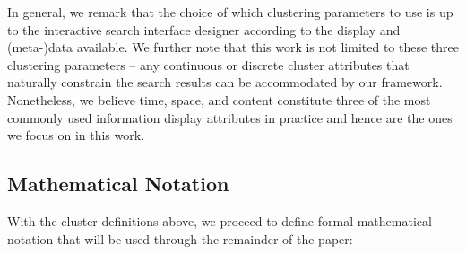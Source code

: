 In general, we remark that the choice of which clustering parameters to use is up to the interactive search interface designer according to the display and (meta-)data available.  We further note that this work is not limited to these three clustering parameters -- any continuous or discrete cluster attributes that naturally constrain the search results can be accommodated by our framework.  Nonetheless, we believe time, space, and content constitute three of the most commonly used information display attributes in practice and hence are the ones we focus on in this work.

\subsection{Mathematical Notation}

With the cluster definitions above, we proceed to define  formal mathematical notation that will be used through the remainder of the paper:

